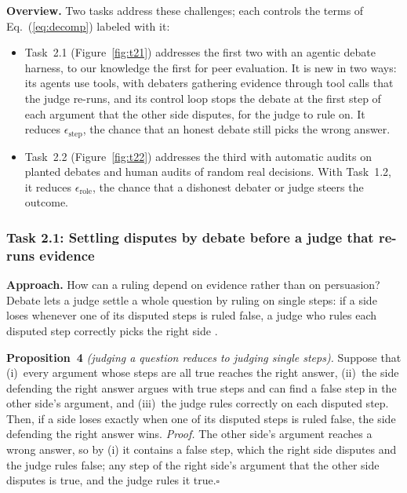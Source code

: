 \documentclass[12pt,letterpaper]{article}
\newcommand{\hd}[1]{\ifhmode\par\fi\addvspace{1pt}\noindent\textbf{#1}\hspace{0.35em}}
\begin{document}
\hd{Overview.} Two tasks address these challenges; each controls the terms of Eq.~(\ref{eq:decomp}) labeled with it:
\begin{itemize}
\item Task~2.1 (Figure~\ref{fig:t21}) addresses the first two with an agentic debate harness, to our knowledge the first for peer evaluation. It is new in two ways: its agents use tools, with debaters gathering evidence through tool calls that the judge re-runs, and its control loop stops the debate at the first step of each argument that the other side disputes, for the judge to rule on. It reduces $\epsilon_{\text{step}}$, the chance that an honest debate still picks the wrong answer.
\item Task~2.2 (Figure~\ref{fig:t22}) addresses the third with automatic audits on planted debates and human audits of random real decisions. With Task~1.2, it reduces $\epsilon_{\text{role}}$, the chance that a dishonest debater or judge steers the outcome.
\end{itemize}


\subsubsection{Task 2.1: Settling disputes by debate before a judge that re-runs evidence}\label{sec:t21}
\hd{Approach.} How can a ruling depend on evidence rather than on persuasion? Debate lets a judge settle a whole question by ruling on single steps: if a side loses whenever one of its disputed steps is ruled false, a judge who rules each disputed step correctly picks the right side \citep{irving2018debate,browncohen2024doubly}.

\textbf{Proposition~4} \textit{(judging a question reduces to judging single steps).} Suppose that (i)~every argument whose steps are all true reaches the right answer, (ii)~the side defending the right answer argues with true steps and can find a false step in the other side's argument, and (iii)~the judge rules correctly on each disputed step. Then, if a side loses exactly when one of its disputed steps is ruled false, the side defending the right answer wins. \textit{Proof.} The other side's argument reaches a wrong answer, so by (i) it contains a false step, which the right side disputes and the judge rules false; any step of the right side's argument that the other side disputes is true, and the judge rules it true.\hfill$\square$
\end{document}
